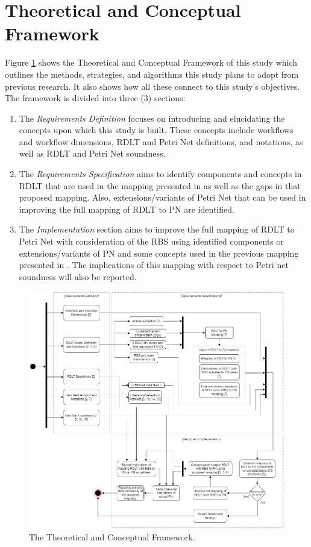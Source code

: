 \section{Theoretical and Conceptual Framework}
Figure \ref{tcf} shows the Theoretical and Conceptual Framework of this study which outlines the methods, strategies, and algorithms this study plans to adopt from previous research. It also shows how all these connect to this study's objectives. The framework is divided into three (3) sections:

    \begin{enumerate}
        \item The \textit{Requirements Definition} focuses on introducing and elucidating the concepts upon which this study is built. These concepts include workflows and workflow dimensions, RDLT and Petri Net definitions, and notations, as well as RDLT and Petri Net soundness.
        \item The \textit{Requirements Specification} aims to identify components and concepts in RDLT that are used in the mapping presented in \cite{sulla-malinao} as well as the gaps in that proposed mapping. Also, extensions/variants of Petri Net that can be used in improving the full mapping of RDLT to PN are identified.
        \item The \textit{Implementation} section aims to improve the full mapping of RDLT to Petri Net with consideration of the RBS using identified components or extensions/variants of PN and some concepts used in the previous mapping presented in \cite{sulla-malinao}. The implications of this mapping with respect to Petri net soundness will also be reported.
    \end{enumerate}

    \begin{figure}[p]
        \centering
        \includegraphics[scale=0.5]{figures/TCF_V5.png}
        \caption{The Theoretical and Conceptual Framework.}
        \label{tcf}
    \end{figure} \par